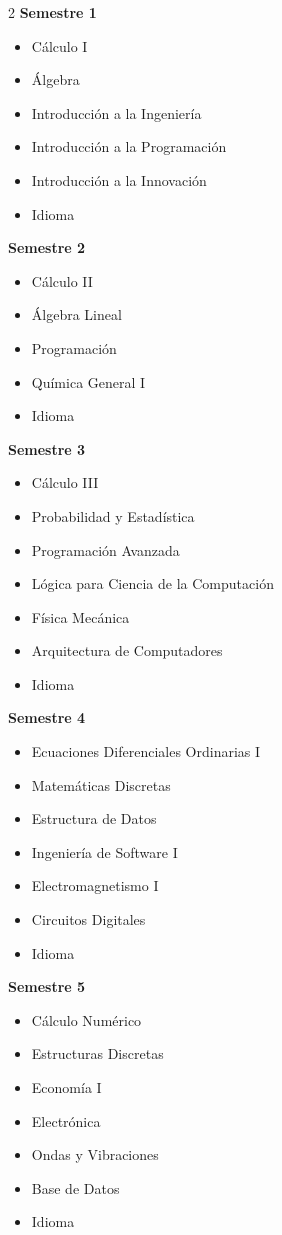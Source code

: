 \documentclass[12pt,a4paper]{article}
\begin{document}
	\begin{multicols}{2}
		\textbf{Semestre 1}
		\begin{itemize}
			\item Cálculo I
			\item Álgebra
			\item Introducción a la Ingeniería
			\item Introducción a la Programación
			\item Introducción a la Innovación
			\item Idioma
		\end{itemize}
		
		\textbf{Semestre 2}
		\begin{itemize}
			\item Cálculo II
			\item Álgebra Lineal
			\item Programación
			\item Química General I
			\item Idioma
		\end{itemize}
		
		\textbf{Semestre 3}
		\begin{itemize}
			\item Cálculo III
			\item Probabilidad y Estadística
			\item Programación Avanzada
			\item Lógica para Ciencia de la Computación
			\item Física Mecánica
			\item Arquitectura de Computadores
			\item Idioma
		\end{itemize}
		
		\textbf{Semestre 4}
		\begin{itemize}
			\item Ecuaciones Diferenciales Ordinarias I
			\item Matemáticas Discretas
			\item Estructura de Datos
			\item Ingeniería de Software I
			\item Electromagnetismo I
			\item Circuitos Digitales
			\item Idioma
		\end{itemize}
		
		\textbf{Semestre 5}
		\begin{itemize}
			\item Cálculo Numérico
			\item Estructuras Discretas
			\item Economía I
			\item Electrónica
			\item Ondas y Vibraciones
			\item Base de Datos
			\item Idioma
		\end{itemize}
		

\end{multicols}
\end{document}
